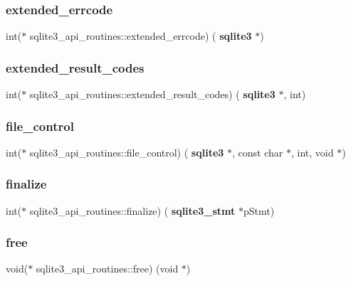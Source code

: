 \subsubsection{extended\_errcode}
{\footnotesize\ttfamily int($\ast$ sqlite3\+\_\+api\+\_\+routines\+::extended\+\_\+errcode) (\textbf{ sqlite3} $\ast$)}

\mbox{\label{structsqlite3__api__routines_afbe050a2c8ff2d13c27e8756e753cf86}} 
\subsubsection{extended\_result\_codes}
{\footnotesize\ttfamily int($\ast$ sqlite3\+\_\+api\+\_\+routines\+::extended\+\_\+result\+\_\+codes) (\textbf{ sqlite3} $\ast$, int)}

\mbox{\label{structsqlite3__api__routines_a629c5e5c03b3223242357282c84af46d}} 
\subsubsection{file\_control}
{\footnotesize\ttfamily int($\ast$ sqlite3\+\_\+api\+\_\+routines\+::file\+\_\+control) (\textbf{ sqlite3} $\ast$, const char $\ast$, int, void $\ast$)}

\mbox{\label{structsqlite3__api__routines_a0bbe0b1cdd61a2e7e089ad1e42978f6f}} 
\subsubsection{finalize}
{\footnotesize\ttfamily int($\ast$ sqlite3\+\_\+api\+\_\+routines\+::finalize) (\textbf{ sqlite3\+\_\+stmt} $\ast$p\+Stmt)}

\mbox{\label{structsqlite3__api__routines_a7418560cd2dacb9a6cb0b7f5e3082787}} 
\subsubsection{free}
{\footnotesize\ttfamily void($\ast$ sqlite3\+\_\+api\+\_\+routines\+::free) (void $\ast$)}

